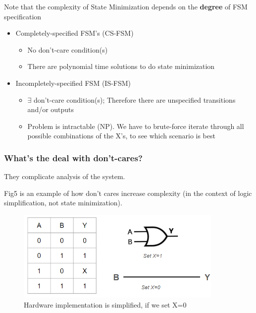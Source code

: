 \documentclass{article}
\begin{document}
Note that the complexity of State Minimization depends on the \textbf{degree} of FSM specification
\begin{itemize}
    \item Completely-specified FSM's (CS-FSM)
        \begin{itemize}
            \item No don't-care condition(s)
            \item There are polynomial time solutions to do state minimization
        \end{itemize}
    \item Incompletely-specified FSM (IS-FSM)
        \begin{itemize}
            \item $\exists$ don't-care condition(s); Therefore there are unspecified transitions and/or outputs
            \item Problem is intractable (NP). We have to brute-force iterate through all possible combinations of the X's, to see which scenario is best
        \end{itemize}
\end{itemize}

\subsubsection{What's the deal with don't-cares?}
They complicate analysis of the system.

Fig5 is an example of how don't cares increase complexity (in the context of logic simplification, not state minimization).

\begin{figure}[htp]
    \centering
    \includegraphics[width=10cm, scale=1]{S2/dontCares.PNG}
    \caption{Hardware implementation is simplified, if we set X=0}
\end{figure}
\end{document}
